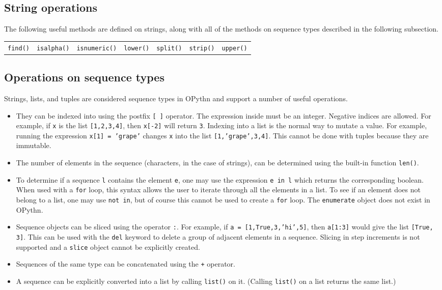 \documentclass[11pt, twoside]{article}
\newcommand{\ms}{\texttt}
\begin{document}
    \subsection{String operations}
    The following useful methods are defined on strings, along with all of the methods on sequence types described in the following subsection.
    \begin{center}
        \begin{tabular}{ccccccc}
            \ms{find()} & \ms{isalpha()} & \ms{isnumeric()} & \ms{lower()} & \ms{split()} & \ms{strip()} & \ms{upper()}\\
    \end{tabular}
    \end{center}

    \subsection{Operations on sequence types}
    Strings, lists, and tuples are considered sequence types in OPythn and support a number of useful operations.
    \begin{itemize}
        \item They can be indexed into using the postfix \ms{[ ]} operator. The expression inside must be an integer. Negative indices are allowed. For example, if \ms{x} is the list \ms{[1,2,3,4]}, then \ms{x[-2]} will return \ms{3}. Indexing into a list is the normal way to mutate a value. For example, running the expression \ms{x[1] = 'grape'} changes \ms{x} into the list \ms{[1,'grape',3,4]}. This cannot be done with tuples because they are immutable.
        \item The number of elements in the sequence (characters, in the case of strings), can be determined using the built-in function \ms{len()}.
        \item To determine if a sequence \ms{l} contains the element \ms{e}, one may use the expression \ms{e in l} which returns the corresponding boolean. When used with a \ms{for} loop, this syntax allows the user to iterate through all the elements in a list. To see if an element does not belong to a list, one may use \ms{not in}, but of course this cannot be used to create a \ms{for} loop. The \ms{enumerate} object does not exist in OPythn.
        \item Sequence objects can be sliced using the operator \ms{:}. For example, if \ms{a = [1,True,3,'hi',5]}, then \ms{a[1:3]} would give the list \ms{[True, 3]}. This can be used with the \ms{del} keyword to delete a group of adjacent elements in a sequence. Slicing in step increments is not supported and a \ms{slice} object cannot be explicitly created.
        \item Sequences of the same type can be concatenated using the \ms{+} operator.
        \item A sequence can be explicitly converted into a list by calling \ms{list()} on it. (Calling \ms{list()} on a list returns the same list.)
    \end{itemize}
\end{document}
